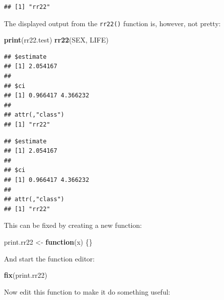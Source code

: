 \documentclass[12pt,a4paper]{book}
\newenvironment{Shaded}{\begin{snugshade}}{\end{snugshade}}
\newcommand{\CharTok}[1]{\textcolor[rgb]{0.31,0.60,0.02}{#1}}
\newcommand{\ControlFlowTok}[1]{\textcolor[rgb]{0.13,0.29,0.53}{\textbf{#1}}}
\newcommand{\DataTypeTok}[1]{\textcolor[rgb]{0.13,0.29,0.53}{#1}}
\newcommand{\DecValTok}[1]{\textcolor[rgb]{0.00,0.00,0.81}{#1}}
\newcommand{\KeywordTok}[1]{\textcolor[rgb]{0.13,0.29,0.53}{\textbf{#1}}}
\newcommand{\NormalTok}[1]{#1}
\newcommand{\OperatorTok}[1]{\textcolor[rgb]{0.81,0.36,0.00}{\textbf{#1}}}
\newcommand{\StringTok}[1]{\textcolor[rgb]{0.31,0.60,0.02}{#1}}
\theoremstyle{definition}
\theoremstyle{definition}
\theoremstyle{definition}
\theoremstyle{remark}
\begin{document}
\begin{verbatim}
## [1] "rr22"
\end{verbatim}

The displayed output from the \texttt{rr22()} function is, however, not
pretty:

\begin{Shaded}
\begin{Highlighting}[]
\KeywordTok{print}\NormalTok{(rr22.test)}
\KeywordTok{rr22}\NormalTok{(SEX, LIFE)}
\end{Highlighting}
\end{Shaded}

\begin{verbatim}
## $estimate
## [1] 2.054167
## 
## $ci
## [1] 0.966417 4.366232
## 
## attr(,"class")
## [1] "rr22"
\end{verbatim}

\begin{verbatim}
## $estimate
## [1] 2.054167
## 
## $ci
## [1] 0.966417 4.366232
## 
## attr(,"class")
## [1] "rr22"
\end{verbatim}

This can be fixed by creating a new function:

\begin{Shaded}
\begin{Highlighting}[]
\NormalTok{print.rr22 <-}\StringTok{ }\ControlFlowTok{function}\NormalTok{(x) \{\}}
\end{Highlighting}
\end{Shaded}

And start the function editor:

\begin{Shaded}
\begin{Highlighting}[]
\KeywordTok{fix}\NormalTok{(print.rr22)}
\end{Highlighting}
\end{Shaded}

Now edit this function to make it do something useful:

\begin{Shaded}
\end{Shaded}
\end{document}
